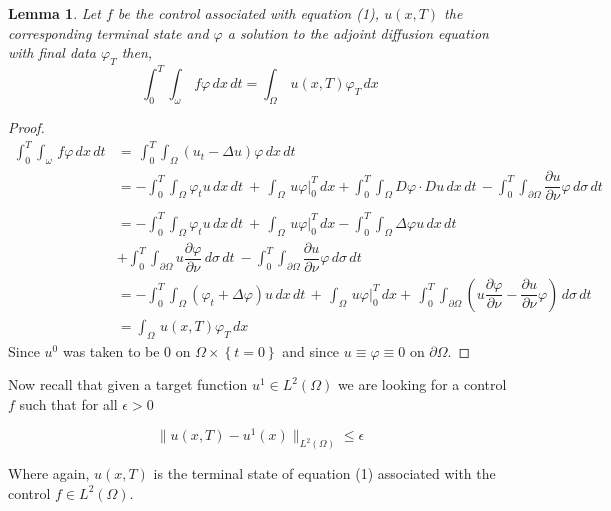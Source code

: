 \documentclass[11pt]{article}
\newtheorem{lemma}[theorem]{Lemma}
\begin{document}
\begin{lemma}
Let $f$ be the control associated with equation (1), $u\left(x,T\right)$ the corresponding terminal state and $\varphi$ a solution to the adjoint diffusion equation with final data $\varphi_T$ then,
$$ \int_{0}^{T}\int_\omega\,f\varphi\,dx\,dt = \int_\Omega\,u \left(x,T\right) \varphi_T\,dx$$
\end{lemma}

\begin{proof}
\begin{equation*}
\begin{aligned}
\int_{0}^{T}\int_\omega\,f\varphi\,dx\,dt &=\, \int_{0}^{T}\int_\Omega\left(u_t-\Delta u\right)\varphi\,dx\,dt\\
&=-\int_{0}^{T}\int_\Omega \varphi_t u\,dx\,dt\ +\,\int_\Omega\,u\varphi\biggr|_{0}^{T}\,dx + \int_{0}^{T}\int_\Omega D\varphi \cdot Du\,dx\,dt\,
- \int_{0}^{T}\int_{\partial\Omega} \dfrac{\partial u}{\partial\nu}\varphi\,d\sigma\,dt\\
\\
&=-\int_{0}^{T}\int_\Omega \varphi_t u\,dx\,dt\ +\,\int_\Omega\,u\varphi\biggr|_{0}^{T}\,dx - \int_{0}^{T}\int_\Omega \Delta\varphi u\,dx\,dt\\
&+\int_{0}^{T}\int_{\partial\Omega} u\dfrac{\partial\varphi}{\partial\nu}\,d\sigma\,dt\ - \int_{0}^{T}\int_{\partial\Omega} \dfrac{\partial u}{\partial\nu}\varphi\,d\sigma\,dt\\
&=-\int_{0}^{T}\int_\Omega\left(\varphi_t + \Delta\varphi\right)u\,dx\,dt\,+\,\int_\Omega\,u\varphi\biggr|_{0}^{T}\,dx +\,\int_{0}^{T}\int_{\partial\Omega}\left(u\dfrac{\partial\varphi}{\partial\nu}-\dfrac{\partial u}{\partial\nu}\varphi\right)\,d\sigma\,dt\\
&=\int_\Omega\,u\left(x,T\right)\varphi_T\,dx
\end{aligned}
\end{equation*}
Since $u^0$ was taken to be $0$ on $\Omega\times\left\{t=0\right\}$ and since $u\equiv\varphi\equiv 0$ on $\partial\Omega$.
\end{proof}

Now recall that given a target function $u^1\in L^2(\Omega)$ we are looking for a control $f$ such that for all $\epsilon>0$

$$\lVert u(x,T)-u^1(x) \rVert_{L^2(\Omega)}^{} \leq\epsilon$$

Where again, $u(x,T)$ is the terminal state of equation (1) associated with the control $f \in L^2(\Omega)$.\\
\end{document}
